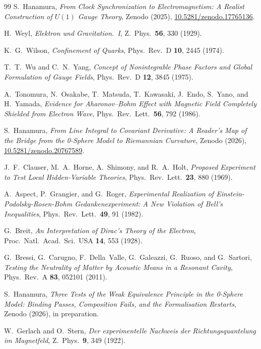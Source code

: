 \documentclass[%
 reprint, amsmath,amssymb, aps, prb, ]{revtex4-2}
\numberwithin{equation}{section}
\begin{document}
\begin{thebibliography}{99}
S.~Hanamura,
\emph{From Clock Synchronization to Electromagnetism: A Realist Construction of $U(1)$ Gauge Theory},
Zenodo (2025), \href{https://doi.org/10.5281/zenodo.17765136}{10.5281/zenodo.17765136}.

H.~Weyl,
\emph{Elektron und Gravitation.~I},
Z.~Phys.\ \textbf{56}, 330 (1929).

K.~G.~Wilson,
\emph{Confinement of Quarks},
Phys.~Rev.~D \textbf{10}, 2445 (1974).

T.~T.~Wu and C.~N.~Yang,
\emph{Concept of Nonintegrable Phase Factors and Global Formulation of Gauge Fields},
Phys.~Rev.~D \textbf{12}, 3845 (1975).

A.~Tonomura, N.~Osakabe, T.~Matsuda, T.~Kawasaki, J.~Endo, S.~Yano, and H.~Yamada,
\emph{Evidence for Aharonov--Bohm Effect with Magnetic Field Completely Shielded from Electron Wave},
Phys.~Rev.~Lett.\ \textbf{56}, 792 (1986).

S.~Hanamura,
\emph{From Line Integral to Covariant Derivative: A Reader's Map of the Bridge from the 0-Sphere Model to Riemannian Curvature},
Zenodo (2026), \href{https://doi.org/10.5281/zenodo.20767589}{10.5281/zenodo.20767589}.

J.~F.~Clauser, M.~A.~Horne, A.~Shimony, and R.~A.~Holt,
\emph{Proposed Experiment to Test Local Hidden-Variable Theories},
Phys.~Rev.~Lett.\ \textbf{23}, 880 (1969).

A.~Aspect, P.~Grangier, and G.~Roger,
\emph{Experimental Realization of Einstein-Podolsky-Rosen-Bohm Gedankenexperiment: A New Violation of Bell's Inequalities},
Phys.~Rev.~Lett.\ \textbf{49}, 91 (1982).

G.~Breit,
\emph{An Interpretation of Dirac's Theory of the Electron},
Proc.~Natl.~Acad.~Sci.~USA \textbf{14}, 553 (1928).

G.~Bressi, G.~Carugno, F.~Della~Valle, G.~Galeazzi, G.~Ruoso, and G.~Sartori,
\emph{Testing the Neutrality of Matter by Acoustic Means in a Resonant Cavity},
Phys.~Rev.~A \textbf{83}, 052101 (2011).

S.~Hanamura,
\emph{Three Tests of the Weak Equivalence Principle in the 0-Sphere Model: Binding Passes, Composition Fails, and the Formalisation Restarts},
Zenodo (2026), in preparation.

W.~Gerlach and O.~Stern,
\emph{Der experimentelle Nachweis der Richtungsquantelung im Magnetfeld},
Z.~Phys.\ \textbf{9}, 349 (1922).


\end{thebibliography}
\end{document}
